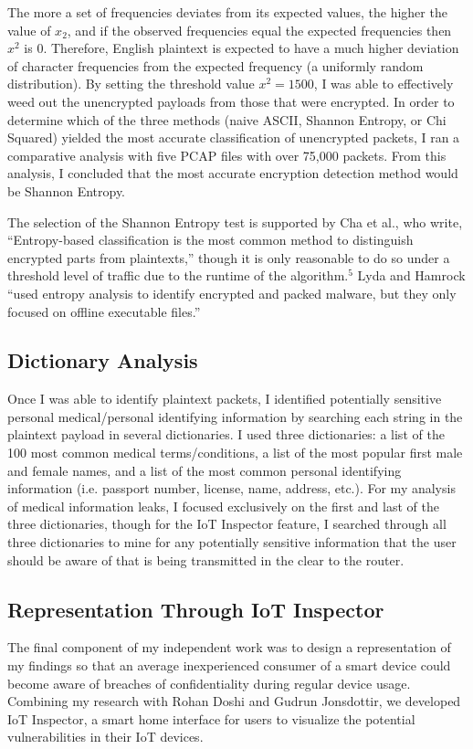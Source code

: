 The more a set of frequencies deviates from its expected values, the higher the value of $x_2$, and if the observed frequencies equal the expected frequencies then $x^2$ is 0. Therefore, English plaintext is expected to have a much higher deviation of character frequencies from the expected frequency (a uniformly random distribution). By setting the threshold value $x^2 = 1500$, I was able to effectively weed out the unencrypted payloads from those that were encrypted. In order to determine which of the three methods (naive ASCII, Shannon Entropy, or Chi Squared) yielded the most accurate classification of unencrypted packets, I ran a comparative analysis with five PCAP files with over 75,000 packets. From this analysis, I concluded that the most accurate encryption detection method would be Shannon Entropy. 

The selection of the Shannon Entropy test is supported by Cha et al., who write, ``Entropy-based classification is the most common method to distinguish encrypted parts from plaintexts,'' though it is only reasonable to do so under a threshold level of traffic due to the runtime of the algorithm.$^5$ Lyda and Hamrock ``used entropy analysis to identify encrypted and packed malware, but they only focused on offline executable files.''

\subsection{Dictionary Analysis}
Once I was able to identify plaintext packets, I identified potentially sensitive personal medical/personal identifying information by searching each string in the plaintext payload in several dictionaries. I used three dictionaries: a list of the 100 most common medical terms/conditions, a list of the most popular first male and female names, and a list of the most common personal identifying information (i.e. passport number, license, name, address, etc.). For my analysis of medical information leaks, I focused exclusively on the first and last of the three dictionaries, though for the IoT Inspector feature, I searched through all three dictionaries to mine for any potentially sensitive information that the user should be aware of that is being transmitted in the clear to the router. 

\subsection{Representation Through IoT Inspector}
The final component of my independent work was to design a representation of my findings so that an average inexperienced consumer of a smart device could become aware of breaches of confidentiality during regular device usage. Combining my research with Rohan Doshi and Gudrun Jonsdottir, we developed IoT Inspector, a smart home interface for users to visualize the potential vulnerabilities in their IoT devices.

